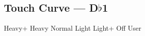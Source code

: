 \subsection[Touch Curve]{Touch Curve --- \UiKey{\I}\UiKey{\SET}D$\flat$1}









































Heavy+
Heavy
Normal
Light
Light+
Off
User
